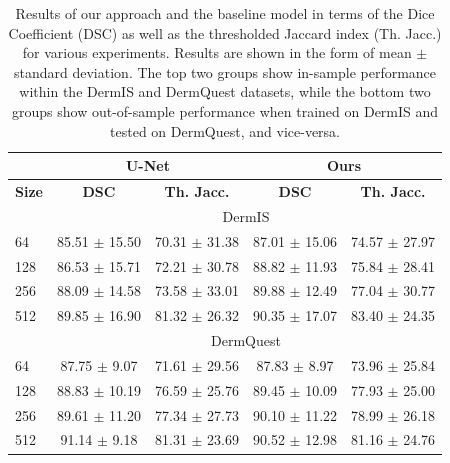 \begin{table}[t!]
\caption{Results of our approach and the baseline model in terms of the Dice Coefficient (DSC) as well as the thresholded Jaccard index (Th. Jacc.) for various experiments. Results are shown in the form of mean $\pm$ standard deviation. The top two groups show in-sample performance within the DermIS and DermQuest datasets, while the bottom two groups show out-of-sample performance when trained on DermIS and tested on DermQuest, and vice-versa.}\label{tab:results}
\def\arraystretch{1.2}
\setlength\tabcolsep{1em}
\begin{tabularx}{\textwidth}{X|cc|cc}
& \multicolumn{2}{c|}{U-Net} & \multicolumn{2}{c}{Ours} \\
\midrule
 \textbf{Size}                                                     & \textbf{DSC}           & \textbf{Th. Jacc.}     & \textbf{DSC}           & \textbf{Th. Jacc.}     \\
\midrule
 &\multicolumn{4}{c}{DermIS}                         \\
\midrule
 64                                                       & 85.51 $\pm$ 15.50 & 70.31 $\pm$ 31.38 & 87.01 $\pm$ 15.06 & 74.57 $\pm$ 27.97 \\
 128                                                      & 86.53 $\pm$ 15.71 & 72.21 $\pm$ 30.78 & 88.82 $\pm$ 11.93 & 75.84 $\pm$ 28.41 \\
 256                                                      & 88.09 $\pm$ 14.58 & 73.58 $\pm$ 33.01 & 89.88 $\pm$ 12.49 & 77.04 $\pm$ 30.77 \\
 512                                                      & 89.85 $\pm$ 16.90 & 81.32 $\pm$ 26.32 & 90.35 $\pm$ 17.07 & 83.40 $\pm$ 24.35 \\
 \midrule
 &\multicolumn{4}{c}{DermQuest}                      \\
\midrule
 64                                                       & 87.75 $\pm$ 9.07  & 71.61 $\pm$ 29.56 & 87.83 $\pm$ 8.97  & 73.96 $\pm$ 25.84 \\
 128                                                      & 88.83 $\pm$ 10.19 & 76.59 $\pm$ 25.76 & 89.45 $\pm$ 10.09 & 77.93 $\pm$ 25.00 \\
 256                                                      & 89.61 $\pm$ 11.20 & 77.34 $\pm$ 27.73 & 90.10 $\pm$ 11.22 & 78.99 $\pm$ 26.18 \\
 512                                                      & 91.14 $\pm$ 9.18  & 81.31 $\pm$ 23.69 & 90.52 $\pm$ 12.98 & 81.16 $\pm$ 24.76 \\

\end{tabularx}
\end{table}
